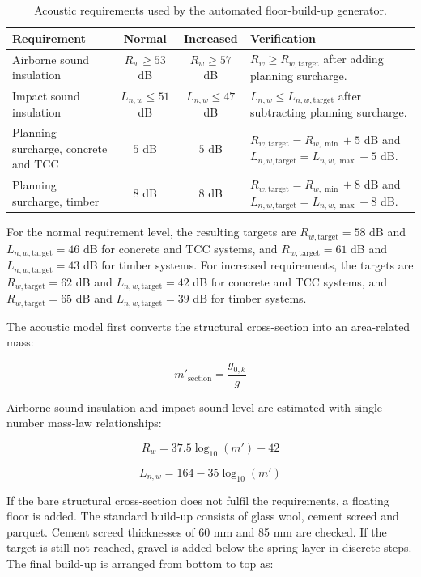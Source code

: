\begin{table}[htbp]
    \centering
    \begingroup
    \small
    \setlength{\tabcolsep}{4pt}
    \renewcommand{\arraystretch}{1.15}
    \begin{tabularx}{\textwidth}{@{}l|c|c|X@{}}
    \hline
    \textbf{Requirement} & \textbf{Normal} & \textbf{Increased} & \textbf{Verification} \\ \hline
    Airborne sound insulation & $R_w \geq 53$ dB & $R_w \geq 57$ dB &
    $R_w \geq R_{w,\mathrm{target}}$ after adding planning surcharge. \\
    Impact sound insulation & $L_{n,w} \leq 51$ dB & $L_{n,w} \leq 47$ dB &
    $L_{n,w} \leq L_{n,w,\mathrm{target}}$ after subtracting planning surcharge. \\
    Planning surcharge, concrete and TCC & $5$ dB & $5$ dB &
    $R_{w,\mathrm{target}}=R_{w,\min}+5$ dB and $L_{n,w,\mathrm{target}}=L_{n,w,\max}-5$ dB. \\
    Planning surcharge, timber & $8$ dB & $8$ dB &
    $R_{w,\mathrm{target}}=R_{w,\min}+8$ dB and $L_{n,w,\mathrm{target}}=L_{n,w,\max}-8$ dB. \\ \hline
    \end{tabularx}
    \endgroup
    \caption{Acoustic requirements used by the automated floor-build-up generator.}
    \label{tab:acoustic_requirements_methods}
\end{table}

\noindent For the normal requirement level, the resulting targets are $R_{w,\mathrm{target}}=58$ dB and $L_{n,w,\mathrm{target}}=46$ dB for concrete and TCC systems, and $R_{w,\mathrm{target}}=61$ dB and $L_{n,w,\mathrm{target}}=43$ dB for timber systems. For increased requirements, the targets are $R_{w,\mathrm{target}}=62$ dB and $L_{n,w,\mathrm{target}}=42$ dB for concrete and TCC systems, and $R_{w,\mathrm{target}}=65$ dB and $L_{n,w,\mathrm{target}}=39$ dB for timber systems.

\noindent The acoustic model first converts the structural cross-section into an area-related mass:

\[
    m'_{\mathrm{section}}=\frac{g_{0,k}}{g}
\]

\noindent Airborne sound insulation and impact sound level are estimated with single-number mass-law relationships:

\[
    R_w = 37.5 \log_{10}(m') - 42
\]

\[
    L_{n,w} = 164 - 35 \log_{10}(m')
\]

\noindent If the bare structural cross-section does not fulfil the requirements, a floating floor is added. The standard build-up consists of glass wool, cement screed and parquet. Cement screed thicknesses of 60 mm and 85 mm are checked. If the target is still not reached, gravel is added below the spring layer in discrete steps. The final build-up is arranged from bottom to top as:

